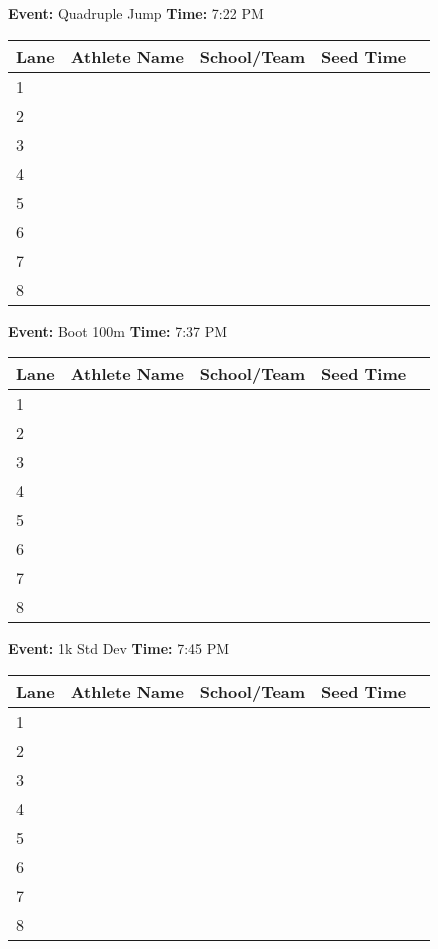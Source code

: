 \documentclass[11pt]{article}
\begin{document}
\textbf{Event:} Quadruple Jump \quad \textbf{Time:} 7:22 PM 

\vspace{1em}
\begin{tabular}{@{}lllll@{}}
\toprule
\textbf{Lane} & \textbf{Athlete Name} & \textbf{School/Team} & \textbf{Seed Time} \\
\midrule
1 & & & \\
2 & & & \\
3 & & & \\
4 & & & \\
5 & & & \\
6 & & & \\
7 & & & \\
8 & & & \\
\bottomrule
\end{tabular}
\vspace{2.5em}


\textbf{Event:} Boot 100m \quad \textbf{Time:} 7:37 PM 

\vspace{1em}
\begin{tabular}{@{}lllll@{}}
\toprule
\textbf{Lane} & \textbf{Athlete Name} & \textbf{School/Team} & \textbf{Seed Time} \\
\midrule
1 & & & \\
2 & & & \\
3 & & & \\
4 & & & \\
5 & & & \\
6 & & & \\
7 & & & \\
8 & & & \\
\bottomrule
\end{tabular}
\vspace{2.5em}


\textbf{Event:} 1k Std Dev \quad \textbf{Time:} 7:45 PM 

\vspace{1em}
\begin{tabular}{@{}lllll@{}}
\toprule
\textbf{Lane} & \textbf{Athlete Name} & \textbf{School/Team} & \textbf{Seed Time} \\
\midrule
1 & & & \\
2 & & & \\
3 & & & \\
4 & & & \\
5 & & & \\
6 & & & \\
7 & & & \\
8 & & & \\
\bottomrule
\end{tabular}
\vspace{2.5em}
\end{document}
